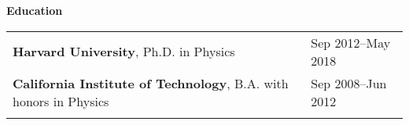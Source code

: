 \documentclass[letterpaper,11pt,oneside]{article}
\begin{document}

 \vspace{0.1cm}
\raggedright
\normalsize
\begin{flushleft}
 \textbf{\Large{Education}} \sout{\hfill} \\
\vspace{0.5cm}
\begin{tabular}{@{} l l }
     \textbf{Harvard University}, Ph.D. in Physics & Sep 2012--May 2018\\
     \textbf{California Institute of Technology}, B.A. with honors in  Physics & Sep 2008--Jun 2012\\
     \hspace{0.78\linewidth} & \hspace{0.1\linewidth} \\
\end{tabular}
\end{flushleft}




\clearpage
\end{document}
